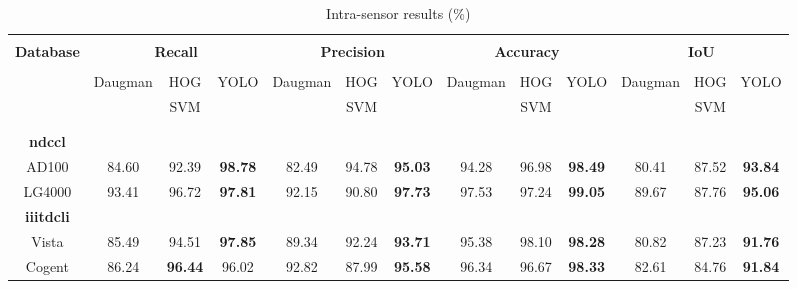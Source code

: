 \documentclass[conference]{IEEEtran}
\begin{document}
\begin{table*}[!ht]
	\centering
	\caption{Intra-sensor results (\%)}
	\label{tab:intra}
	\begin{tabular}{c c c c c c c c c c c c c}\hline  \\[\dimexpr-\normalbaselineskip+4pt]

		 \multirow{3}{*}{\textbf{Database}}  & \multicolumn{3}{c}{\textbf{Recall}} & \multicolumn{3}{c}{\textbf{Precision}} & \multicolumn{3}{c}{\textbf{Accuracy}} & \multicolumn{3}{c}{\textbf{IoU}} \\
		 \\[\dimexpr-\normalbaselineskip+2pt] 
		 
& Daugman & HOG & \multirow{2}{*}{YOLO}  
 & Daugman & HOG & \multirow{2}{*}{YOLO} 
  & Daugman & HOG & \multirow{2}{*}{YOLO} 
   & Daugman & HOG & \multirow{2}{*}{YOLO} \\
& ~\cite{daugman2004iris} 
             & SVM &    
 & ~\cite{daugman2004iris} 
              & SVM &    
  & ~\cite{daugman2004iris} 
               & SVM &    
   & ~\cite{daugman2004iris} 
                & SVM &     \\
		 \\[\dimexpr-\normalbaselineskip+2pt] \toprule
		 \\[\dimexpr-\normalbaselineskip+2pt]	
		\textbf{\gls*{ndccl}} \\ AD100     &  84.60  &  92.39  & \textbf{98.78} & 82.49   & 94.78    & \textbf{95.03} & 94.28   & 96.98   & \textbf{98.49}  & 80.41   & 87.52      & \textbf{93.84}   \\ 
		        LG4000             &  93.41  & 96.72   & \textbf{97.81} & 92.15   & 90.80    & \textbf{97.73} & 97.53   & 97.24   & \textbf{99.05}  & 89.67   & 87.76      & \textbf{95.06}   \\ \midrule
		\textbf{\gls*{iiitdcli}} \\  Vista &  85.49  & 94.51   & \textbf{97.85} & 89.34   & 92.24    & \textbf{93.71} & 95.38   & 98.10   & \textbf{98.28}  & 80.82   & 87.23      & \textbf{91.76}   \\ 
		 Cogent                      &  86.24  & \textbf{96.44}   & 96.02 & 92.82   & 87.99    & \textbf{95.58} & 96.34   & 96.67   & \textbf{98.33}  & 82.61   & 84.76      & \textbf{91.84}   \\ \midrule
		

\end{tabular}
\end{table*}
\end{document}
